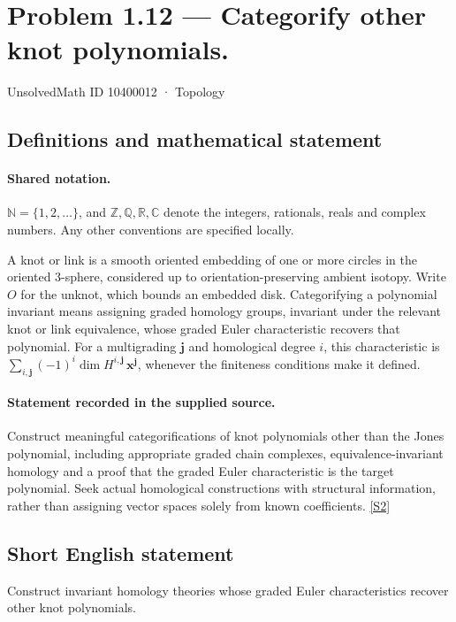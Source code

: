\documentclass[11pt]{article}
\newcommand{\sref}[2]{\hyperlink{source:#1:#2}{[S#2]}}
\begin{document}
\setcounter{section}{10400011}
\section{Problem 1.12 — Categorify other knot polynomials.}\label{10400012}
{\small\sffamily UnsolvedMath ID 10400012 · Topology}
\subsection{Definitions and mathematical statement}

\paragraph{Shared notation.}$\mathbb N=\{1,2,\ldots\}$, and $\mathbb Z,\mathbb Q,\mathbb R,\mathbb C$ denote the integers, rationals, reals and complex numbers. Any other conventions are specified locally.


A knot or link is a smooth oriented embedding of one or more circles in the oriented $3$-sphere, considered up to orientation-preserving ambient isotopy. Write $O$ for the unknot, which bounds an embedded disk. Categorifying a polynomial invariant means assigning graded homology groups, invariant under the relevant knot or link equivalence, whose graded Euler characteristic recovers that polynomial. For a multigrading $\mathbf j$ and homological degree $i$, this characteristic is $\sum_{i,\mathbf j}(-1)^i\dim H^{i,\mathbf j}\,\mathbf x^{\mathbf j}$, whenever the finiteness conditions make it defined.
\paragraph{Statement recorded in the supplied source.}
Construct meaningful categorifications of knot polynomials other than the Jones polynomial, including appropriate graded chain complexes, equivalence-invariant homology and a proof that the graded Euler characteristic is the target polynomial. Seek actual homological constructions with structural information, rather than assigning vector spaces solely from known coefficients. \sref{10400012}{2}
\subsection{Short English statement}
Construct invariant homology theories whose graded Euler characteristics recover other knot polynomials.
\end{document}
